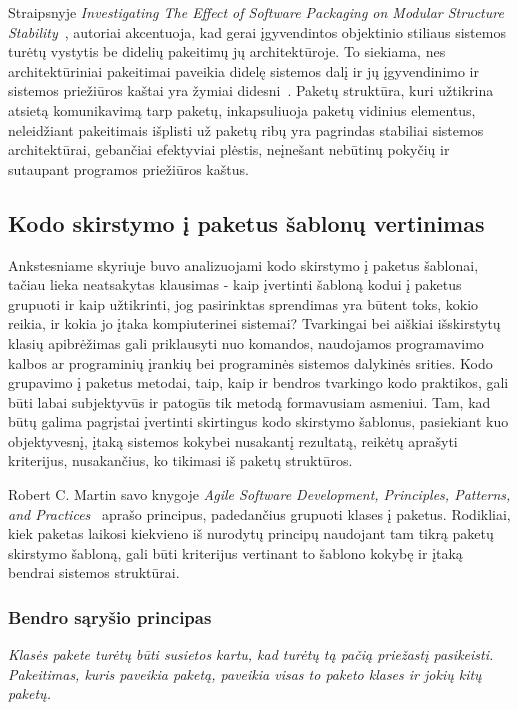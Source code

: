 Straipsnyje \textit{Investigating The Effect of Software Packaging on Modular Structure Stability}~\cite{ModularStability}, autoriai akcentuoja, kad
gerai įgyvendintos objektinio stiliaus sistemos turėtų vystytis be didelių pakeitimų jų architektūroje.
To siekiama, nes architektūriniai pakeitimai paveikia didelę sistemos dalį ir
jų įgyvendinimo ir sistemos priežiūros kaštai yra žymiai didesni~\cite{ModularStability}.
Paketų struktūra, kuri užtikrina atsietą  komunikavimą tarp paketų, inkapsuliuoja paketų vidinius elementus, neleidžiant pakeitimais
išplisti už paketų ribų yra pagrindas stabiliai sistemos architektūrai, gebančiai efektyviai plėstis, neįnešant nebūtinų pokyčių ir sutaupant programos priežiūros kaštus.

\subsection{Kodo skirstymo į paketus šablonų vertinimas}
Ankstesniame skyriuje buvo analizuojami kodo skirstymo į paketus šablonai,
tačiau lieka neatsakytas klausimas - kaip įvertinti šabloną kodui į paketus grupuoti ir kaip užtikrinti,
jog pasirinktas sprendimas yra būtent toks, kokio reikia, ir kokia jo įtaka kompiuterinei sistemai?
Tvarkingai bei aiškiai išskirstytų klasių apibrėžimas gali priklausyti nuo komandos,
naudojamos programavimo kalbos ar programinių įrankių bei programinės sistemos dalykinės srities.
Kodo grupavimo į paketus metodai, taip, kaip ir bendros tvarkingo kodo praktikos,
gali būti labai subjektyvūs ir patogūs tik metodą formavusiam asmeniui.
Tam, kad būtų galima pagrįstai įvertinti skirtingus kodo skirstymo šablonus, pasiekiant kuo objektyvesnį,
įtaką sistemos kokybei nusakantį rezultatą, reikėtų aprašyti kriterijus, nusakančius, ko tikimasi iš paketų struktūros.

Robert C. Martin savo knygoje \textit{Agile Software Development, Principles, Patterns, and Practices}~\cite{AgileSoftwareDevelopment} aprašo
principus, padedančius grupuoti klases į paketus.
Rodikliai, kiek paketas laikosi kiekvieno iš nurodytų principų naudojant tam tikrą paketų skirstymo šabloną, gali
būti kriterijus vertinant to šablono kokybę ir įtaką bendrai sistemos struktūrai.

\subsubsection{Bendro sąryšio principas}
\textit{Klasės pakete turėtų būti susietos kartu, kad turėtų tą pačią priežastį pasikeisti. Pakeitimas,
kuris paveikia paketą, paveikia visas to paketo klases ir jokių kitų paketų.}

